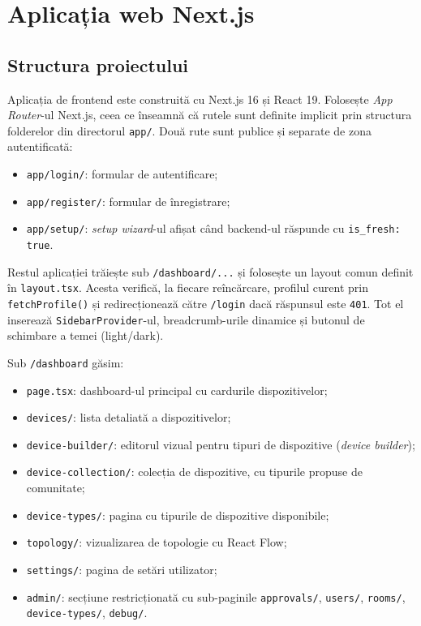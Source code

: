 \chapter{Aplicația web Next.js}

\section{Structura proiectului}
Aplicația de frontend este construită cu Next.js 16 și React 19. Folosește \textit{App Router}-ul Next.js, ceea ce înseamnă că rutele sunt definite implicit prin structura folderelor din directorul \texttt{app/}. Două rute sunt publice și separate de zona autentificată:
\begin{itemize}
    \item \texttt{app/login/}: formular de autentificare;
    \item \texttt{app/register/}: formular de înregistrare;
    \item \texttt{app/setup/}: \textit{setup wizard}-ul afișat când backend-ul răspunde cu \texttt{is\_fresh: true}.
\end{itemize}

Restul aplicației trăiește sub \texttt{/dashboard/...} și folosește un layout comun definit în \texttt{layout.tsx}. Acesta verifică, la fiecare reîncărcare, profilul curent prin \texttt{fetchProfile()} și redirecționează către \texttt{/login} dacă răspunsul este \texttt{401}. Tot el inserează \texttt{SidebarProvider}-ul, breadcrumb-urile dinamice și butonul de schimbare a temei (light/dark).

Sub \texttt{/dashboard} găsim:
\begin{itemize}
    \item \texttt{page.tsx}: dashboard-ul principal cu cardurile dispozitivelor;
    \item \texttt{devices/}: lista detaliată a dispozitivelor;
    \item \texttt{device-builder/}: editorul vizual pentru tipuri de dispozitive (\textit{device builder});
    \item \texttt{device-collection/}: colecția de dispozitive, cu tipurile propuse de comunitate;
    \item \texttt{device-types/}: pagina cu tipurile de dispozitive disponibile;
    \item \texttt{topology/}: vizualizarea de topologie cu React Flow;
    \item \texttt{settings/}: pagina de setări utilizator;
    \item \texttt{admin/}: secțiune restricționată cu sub-paginile \texttt{approvals/}, \texttt{users/}, \texttt{rooms/}, \texttt{device-types/}, \texttt{debug/}.
\end{itemize}

